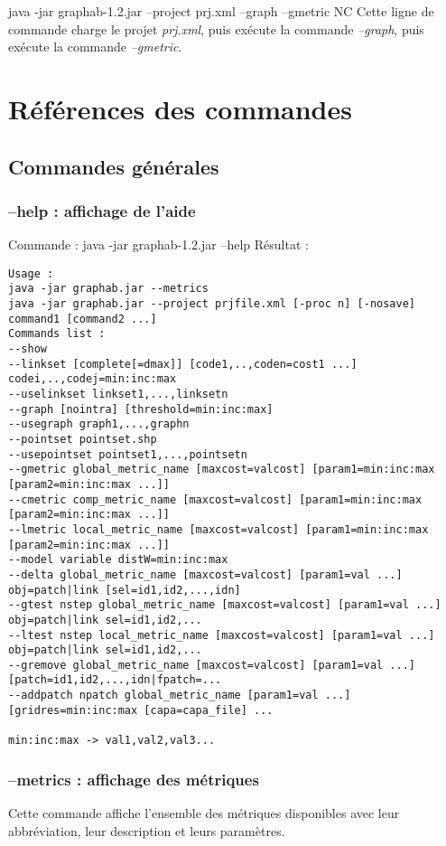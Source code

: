 \documentclass[a4paper,10pt]{report}
\newenvironment{cmd}
{\quote\Verbatim}
{\endVerbatim\endquote}
\begin{document}
\begin{cmd}
java -jar graphab-1.2.jar --project prj.xml --graph --gmetric NC  
\end{cmd}
Cette ligne de commande charge le projet \textit{prj.xml}, puis exécute la commande \textit{--graph}, puis exécute la commande \textit{--gmetric}.


\chapter{Références des commandes}
\section{Commandes générales}
\subsection{--help : affichage de l'aide}
Commande :
\begin{cmd}
java -jar graphab-1.2.jar --help
\end{cmd}
Résultat :
\begin{verbatim}
Usage :
java -jar graphab.jar --metrics
java -jar graphab.jar --project prjfile.xml [-proc n] [-nosave] command1 [command2 ...]
Commands list :
--show
--linkset [complete[=dmax]] [code1,..,coden=cost1 ...] codei,..,codej=min:inc:max
--uselinkset linkset1,...,linksetn
--graph [nointra] [threshold=min:inc:max]
--usegraph graph1,...,graphn
--pointset pointset.shp
--usepointset pointset1,...,pointsetn
--gmetric global_metric_name [maxcost=valcost] [param1=min:inc:max [param2=min:inc:max ...]]
--cmetric comp_metric_name [maxcost=valcost] [param1=min:inc:max [param2=min:inc:max ...]]
--lmetric local_metric_name [maxcost=valcost] [param1=min:inc:max [param2=min:inc:max ...]]
--model variable distW=min:inc:max
--delta global_metric_name [maxcost=valcost] [param1=val ...] obj=patch|link [sel=id1,id2,...,idn]
--gtest nstep global_metric_name [maxcost=valcost] [param1=val ...] obj=patch|link sel=id1,id2,...
--ltest nstep local_metric_name [maxcost=valcost] [param1=val ...] obj=patch|link sel=id1,id2,...
--gremove global_metric_name [maxcost=valcost] [param1=val ...] [patch=id1,id2,...,idn|fpatch=...
--addpatch npatch global_metric_name [param1=val ...] [gridres=min:inc:max [capa=capa_file] ...

min:inc:max -> val1,val2,val3...
\end{verbatim}

\subsection{--metrics : affichage des métriques}
Cette commande affiche l'ensemble des métriques disponibles avec leur abbréviation, leur description et leurs paramètres.
\end{document}
